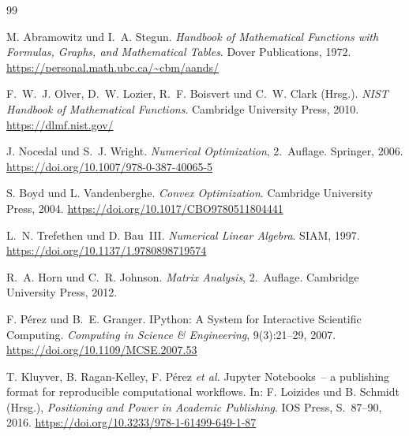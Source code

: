 \documentclass[12pt, a4paper]{article}
\begin{document}
\begin{thebibliography}{99}

M. Abramowitz und I.~A. Stegun.
\textit{Handbook of Mathematical Functions with Formulas, Graphs,
and Mathematical Tables}.
Dover Publications, 1972.
\url{https://personal.math.ubc.ca/~cbm/aands/}

F.~W.~J. Olver, D.~W. Lozier, R.~F. Boisvert und C.~W. Clark (Hrsg.).
\textit{{NIST} Handbook of Mathematical Functions}.
Cambridge University Press, 2010.
\url{https://dlmf.nist.gov/}


J. Nocedal und S.~J. Wright.
\textit{Numerical Optimization}, 2.~Auflage.
Springer, 2006.
\url{https://doi.org/10.1007/978-0-387-40065-5}

S. Boyd und L. Vandenberghe.
\textit{Convex Optimization}.
Cambridge University Press, 2004.
\url{https://doi.org/10.1017/CBO9780511804441}


L.~N. Trefethen und D. Bau~III.
\textit{Numerical Linear Algebra}.
SIAM, 1997.
\url{https://doi.org/10.1137/1.9780898719574}

R.~A. Horn und C.~R. Johnson.
\textit{Matrix Analysis}, 2.~Auflage.
Cambridge University Press, 2012.


F. Pérez und B.~E. Granger.
{IPython}: A System for Interactive Scientific Computing.
\textit{Computing in Science \& Engineering}, 9(3):21--29, 2007.
\url{https://doi.org/10.1109/MCSE.2007.53}

T. Kluyver, B. Ragan-Kelley, F. Pérez \textit{et al.}
Jupyter Notebooks~-- a publishing format for reproducible computational
workflows.
In: F. Loizides und B. Schmidt (Hrsg.), \textit{Positioning and Power in
Academic Publishing}. IOS Press, S.~87--90, 2016.
\url{https://doi.org/10.3233/978-1-61499-649-1-87}


\end{thebibliography}
\end{document}
